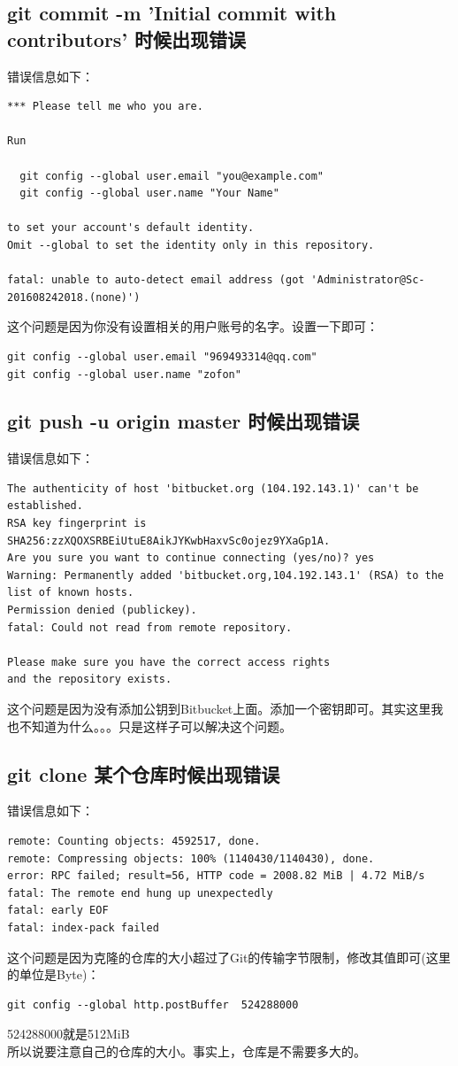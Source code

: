 \documentclass[a4paper,12pt]{ctexart}
\begin{document}
\subsection{git commit -m 'Initial commit with contributors' 时候出现错误}
错误信息如下：
\begin{verbatim}
*** Please tell me who you are.

Run

  git config --global user.email "you@example.com"
  git config --global user.name "Your Name"

to set your account's default identity.
Omit --global to set the identity only in this repository.

fatal: unable to auto-detect email address (got 'Administrator@Sc-201608242018.(none)')
\end{verbatim}
这个问题是因为你没有设置相关的用户账号的名字。设置一下即可：
\begin{verbatim}
git config --global user.email "969493314@qq.com"
git config --global user.name "zofon"
\end{verbatim}

\subsection{git push -u origin master 时候出现错误}
错误信息如下：
\begin{verbatim}
The authenticity of host 'bitbucket.org (104.192.143.1)' can't be established.
RSA key fingerprint is SHA256:zzXQOXSRBEiUtuE8AikJYKwbHaxvSc0ojez9YXaGp1A.
Are you sure you want to continue connecting (yes/no)? yes
Warning: Permanently added 'bitbucket.org,104.192.143.1' (RSA) to the list of known hosts.
Permission denied (publickey).
fatal: Could not read from remote repository.

Please make sure you have the correct access rights
and the repository exists.
\end{verbatim}
这个问题是因为没有添加公钥到Bitbucket上面。添加一个密钥即可。其实这里我也不知道为什么。。。只是这样子可以解决这个问题。

\subsection{git clone 某个仓库时候出现错误}
错误信息如下：
\begin{verbatim}
remote: Counting objects: 4592517, done.
remote: Compressing objects: 100% (1140430/1140430), done.
error: RPC failed; result=56, HTTP code = 2008.82 MiB | 4.72 MiB/s
fatal: The remote end hung up unexpectedly
fatal: early EOF
fatal: index-pack failed
\end{verbatim}
这个问题是因为克隆的仓库的大小超过了Git的传输字节限制，修改其值即可(这里的单位是Byte)：\\
\begin{verbatim}
git config --global http.postBuffer  524288000
\end{verbatim}
524288000就是512MiB\\
所以说要注意自己的仓库的大小。事实上，仓库是不需要多大的。
\end{document}
